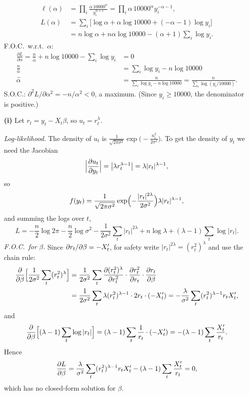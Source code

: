 \documentclass[11pt]{article}
\begin{document}
\begin{align*}
  \ell(\alpha)&=\prod_i\frac{\alpha\,10000^{\alpha}}{y_i^{\alpha+1}}=\prod_i\alpha\,10000^{\alpha}y_i^{-\alpha-1},\\
  L(\alpha)&=\sum_i\bigl[\log\alpha+\alpha\log10000+(-\alpha-1)\log y_i\bigr]\\
  &=n\log\alpha+n\alpha\log10000-(\alpha+1)\sum_i\log y_i .
\end{align*}
F.O.C.\ w.r.t.\ $\alpha$:
\begin{align*}
  \frac{\partial L}{\partial\alpha}=\frac{n}{\hat\alpha}+n\log10000-\sum_i\log y_i&=0\\
  \frac{n}{\hat\alpha}&=\sum_i\log y_i-n\log10000\\
  \hat\alpha&=\frac{n}{\sum_i\log y_i-n\log10000}=\frac{n}{\sum_i\log(y_i/10000)} .
\end{align*}
S.O.C.: $\partial^2L/\partial\alpha^2=-n/\alpha^2<0$, a maximum. (Since $y_i\ge10000$, the denominator is positive.)

\textbf{(i)} Let $r_t=y_t-X_t\beta$, so $u_t=r_t^{\lambda}$.

\emph{Log-likelihood.} The density of $u_t$ is $\frac{1}{\sqrt{2\pi\sigma^2}}\exp\bigl(-\frac{u_t^2}{2\sigma^2}\bigr)$.
To get the density of $y_t$ we need the Jacobian
\[
  \Bigl|\frac{\partial u_t}{\partial y_t}\Bigr|=\bigl|\lambda r_t^{\lambda-1}\bigr|=\lambda|r_t|^{\lambda-1},
\]
so
\[
  f(y_t)=\frac{1}{\sqrt{2\pi\sigma^2}}\exp\Bigl(-\frac{|r_t|^{2\lambda}}{2\sigma^2}\Bigr)\lambda|r_t|^{\lambda-1},
\]
and summing the logs over $t$,
\[
  L=-\frac n2\log2\pi-\frac n2\log\sigma^2-\frac1{2\sigma^2}\sum_t|r_t|^{2\lambda}+n\log\lambda+(\lambda-1)\sum_t\log|r_t| .
\]
\emph{F.O.C.\ for $\beta$.} Since $\partial r_t/\partial\beta=-X_t^{\prime}$, for safety write $|r_t|^{2\lambda}=(r_t^2)^{\lambda}$ and use the chain rule:
\begin{align*}
  \frac{\partial}{\partial\beta}\Bigl[\frac1{2\sigma^2}\sum_t(r_t^2)^{\lambda}\Bigr]
  &=\frac1{2\sigma^2}\sum_t\frac{\partial(r_t^2)^{\lambda}}{\partial r_t^2}\cdot\frac{\partial r_t^2}{\partial r_t}\cdot\frac{\partial r_t}{\partial\beta}\\
  &=\frac1{2\sigma^2}\sum_t\lambda(r_t^2)^{\lambda-1}\cdot2r_t\cdot(-X_t^{\prime})
  =-\frac{\lambda}{\sigma^2}\sum_t(r_t^2)^{\lambda-1}r_tX_t^{\prime},
\end{align*}
and
\[
  \frac{\partial}{\partial\beta}\Bigl[(\lambda-1)\sum_t\log|r_t|\Bigr]=(\lambda-1)\sum_t\frac{1}{r_t}\cdot(-X_t^{\prime})=-(\lambda-1)\sum_t\frac{X_t^{\prime}}{r_t}.
\]
Hence
\[
  \frac{\partial L}{\partial\beta}=\frac{\lambda}{\sigma^2}\sum_t(r_t^2)^{\lambda-1}r_tX_t^{\prime}-(\lambda-1)\sum_t\frac{X_t^{\prime}}{r_t}=0 ,
\]
which has no closed-form solution for $\beta$.
\end{document}
